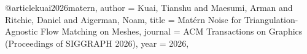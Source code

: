 @article{kuai2026matern,
  author    = {Kuai, Tianshu and Maesumi, Arman and Ritchie, Daniel and Aigerman, Noam},
  title     = {Matérn Noise for Triangulation-Agnostic Flow Matching on Meshes},
  journal   = {ACM Transactions on Graphics (Proceedings of SIGGRAPH 2026)},
  year      = {2026},
}